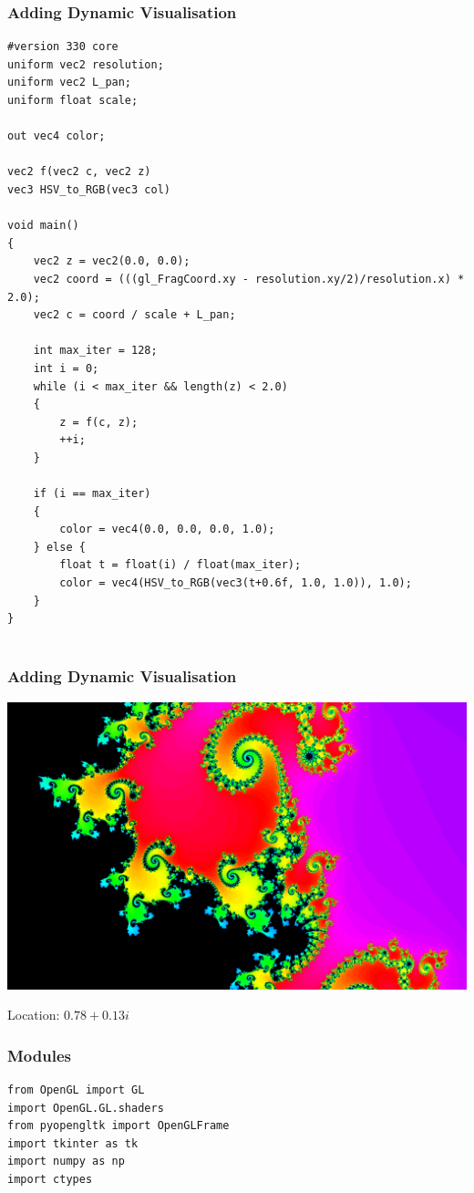 \documentclass{beamer}
\begin{document}
\begin{frame}[fragile]
\frametitle{Adding Dynamic Visualisation}

\begin{verbatim}
#version 330 core
uniform vec2 resolution;
uniform vec2 L_pan;
uniform float scale;

out vec4 color;

vec2 f(vec2 c, vec2 z)
vec3 HSV_to_RGB(vec3 col)

void main()
{
    vec2 z = vec2(0.0, 0.0);
    vec2 coord = (((gl_FragCoord.xy - resolution.xy/2)/resolution.x) * 2.0);
    vec2 c = coord / scale + L_pan;

    int max_iter = 128;
    int i = 0;
    while (i < max_iter && length(z) < 2.0)
    {
        z = f(c, z);
        ++i;
    }

    if (i == max_iter)
    {
        color = vec4(0.0, 0.0, 0.0, 1.0);
    } else {
        float t = float(i) / float(max_iter);
        color = vec4(HSV_to_RGB(vec3(t+0.6f, 1.0, 1.0)), 1.0);
    }
}


\end{verbatim}
\end{frame}


\begin{frame}
\frametitle{Adding Dynamic Visualisation}
\includegraphics[width=1.0\textwidth]{ZoomedMandelbrot.png}
\par \tiny {Location: $0.78 + 0.13i$}
\end{frame}


\begin{frame}[fragile]
\frametitle{Modules}

\begin{verbatim}
from OpenGL import GL
import OpenGL.GL.shaders
from pyopengltk import OpenGLFrame
import tkinter as tk
import numpy as np
import ctypes
\end{verbatim}
\end{frame}
\end{document}
